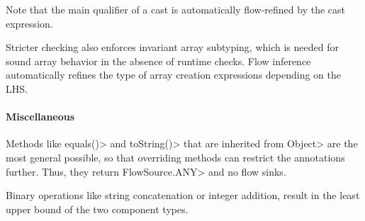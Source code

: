 Note that the main qualifier of a cast is automatically flow-refined
by the cast expression.


\medskip

Stricter checking also enforces invariant array subtyping, which is
needed for sound array behavior in the absence of runtime checks.
Flow inference automatically refines the type of array creation
expressions depending on the LHS.



\paragraph{Miscellaneous}

Methods like \<equals()> and \<toString()> that are inherited from
\<Object> are the most general possible, so that overriding methods
can restrict the annotations further. Thus, they
return \<FlowSource.ANY> and no flow sinks.

Binary operations like string concatenation or integer addition,
result in the least upper bound of the two component types.


